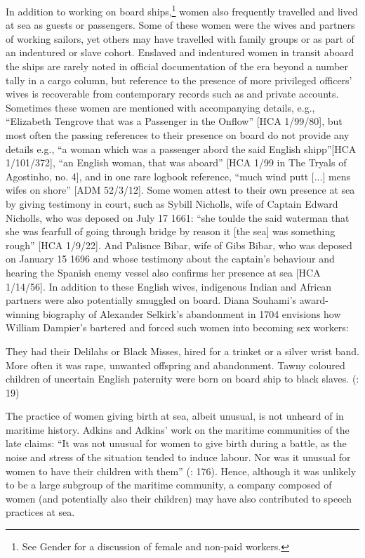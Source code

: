 In addition to working on board ships,\footnote{See  Gender for a discussion of female  and non-paid workers.} women also frequently travelled and lived at sea as guests or passengers. Some of these women were the wives and partners of working sailors, yet others may have travelled with family groups or as part of an indentured or slave cohort. Enslaved and indentured women in transit aboard the ships are rarely noted in official documentation of the era beyond a number tally in a cargo column, but reference to the presence of more privileged officers’ wives is recoverable from contemporary records such as  and private accounts. Sometimes these women are mentioned with accompanying details, e.g., “Elizabeth Tengrove that was a Passenger in the Onflow” [HCA 1/99/80], but most often the passing references to their presence on board do not provide any details e.g., “a woman which was a passenger abord the said English shipp”[HCA 1/101/372], “an English woman, that was aboard” [HCA 1/99 in The Tryals of Agostinho, no. 4], and in one rare logbook reference, “much wind putt [...] mens wifes on shore” [ADM 52/3/12]. Some women attest to their own presence at sea by giving testimony in court, such as Sybill Nicholls, wife of Captain Edward Nicholls, who was deposed on July 17 1661: “she toulde the said waterman that she was fearfull of going through bridge by reason it [the sea] was something rough” [HCA 1/9/22]. And Palisnce Bibar, wife of  Gibs Bibar, who was deposed on January 15 1696 and whose testimony about the captain's behaviour and hearing the Spanish enemy vessel also confirms her presence at sea [HCA 1/14/56]. In addition to these English wives, indigenous Indian and African partners were also potentially smuggled on board. Diana Souhami’s award-winning biography of Alexander Selkirk’s abandonment in 1704 envisions how William Dampier’s  bartered and forced such women into becoming sex workers:

\begin{modquote}
They had their Delilahs or Black Misses, hired for a trinket or a silver wrist band. More often it was rape, unwanted offspring and abandonment. Tawny coloured children of uncertain English paternity were born on board ship to black slaves. (\citealt{Souhami2013}: 19)
\end{modquote}

\largerpage
The practice of women giving birth at sea, albeit unusual, is not unheard of in maritime history. Adkins and Adkins’ work on the maritime communities of the late  claims: “It was not unusual for women to give birth during a battle, as the noise and stress of the situation tended to induce labour. Nor was it unusual for women to have their children with them” (\citealt{AdkinsAdkins2008}: 176). Hence, although it was unlikely to be a large subgroup of the maritime community, a company composed of women (and potentially also their children) may have also contributed to speech practices at sea. 

